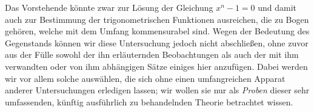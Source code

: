 Das Vorstehende könnte zwar zur Lösung der Gleichung \(x^n-1=0\) und damit auch zur Bestimmung der trigonometrischen Funktionen ausreichen, die zu Bogen gehören, welche mit dem Umfang kommensurabel sind. Wegen der Bedeutung des Gegenstands können wir diese Untersuchung jedoch nicht abschließen, ohne zuvor aus der Fülle sowohl der ihn erläuternden Beobachtungen als auch der mit ihm verwandten oder von ihm abhängigen Sätze einiges hier anzufügen. Dabei werden wir vor allem solche auswählen, die sich ohne einen umfangreichen Apparat anderer Untersuchungen erledigen lassen; wir wollen sie nur als \textit{Proben} dieser sehr umfassenden, künftig ausführlich zu behandelnden Theorie betrachtet wissen.

